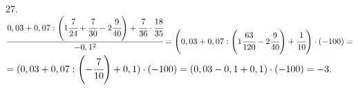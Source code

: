 27. $\cfrac{0,03+0,07:\left(1\cfrac{7}{24}+\cfrac{7}{30}-2\cfrac{9}{40}\right)+\cfrac{7}{36}\cdot\cfrac{18}{35}}{-0,1^2}=
\left(0,03+0,07:\left(1\cfrac{63}{120}-2\cfrac{9}{40}\right)+\cfrac{1}{10}\right)\cdot(-100)=$\\$=
(0,03+0,07:\left(-\cfrac{7}{10}\right)+0,1)\cdot(-100)=(0,03-0,1+0,1)\cdot(-100)=-3.$\\
